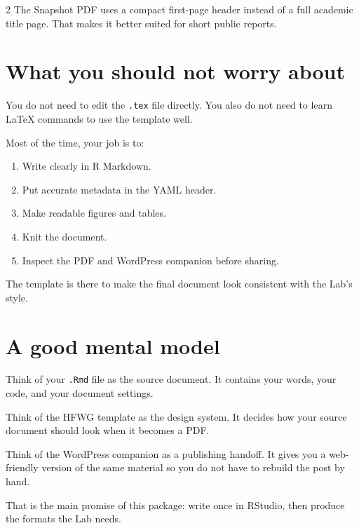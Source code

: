 \documentclass[12pt]{article}
\providecommand{\tightlist}{%
  \setlength{\itemsep}{0pt}%
  \setlength{\parskip}{0pt}%
}
\begin{document}
\begin{multicols}{2}
The Snapshot PDF uses a compact first-page header instead of a full
academic title page. That makes it better suited for short public
reports.

\section{What you should not worry
about}\label{what-you-should-not-worry-about}

You do not need to edit the \texttt{.tex} file directly. You also do not
need to learn LaTeX commands to use the template well.

Most of the time, your job is to:

\begin{enumerate}
\def\labelenumi{\arabic{enumi}.}
\tightlist
\item
  Write clearly in R Markdown.
\item
  Put accurate metadata in the YAML header.
\item
  Make readable figures and tables.
\item
  Knit the document.
\item
  Inspect the PDF and WordPress companion before sharing.
\end{enumerate}

The template is there to make the final document look consistent with
the Lab's style.

\section{A good mental model}\label{a-good-mental-model}

Think of your \texttt{.Rmd} file as the source document. It contains
your words, your code, and your document settings.

Think of the HFWG template as the design system. It decides how your
source document should look when it becomes a PDF.

Think of the WordPress companion as a publishing handoff. It gives you a
web-friendly version of the same material so you do not have to rebuild
the post by hand.

That is the main promise of this package: write once in RStudio, then
produce the formats the Lab needs.



\end{multicols}
\end{document}
